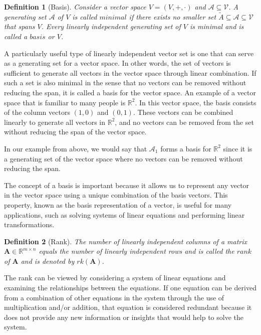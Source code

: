 \documentclass[12pt]{book}
\newtheorem{definition}{Definition}[section]
\begin{document}
	\begin{definition}[Basis]
		\normalfont Consider a vector space $\textit{V} = (\textit{V}, +, \cdot)$ and $\mathcal{A} \subseteq \mathcal{V}$. A generating set $\mathcal{A}$ of $\textit{V}$ is called $\textit{minimal}$ if there exists no smaller set $\tilde{A} \subseteq \mathcal{A} \subseteq \mathcal{V}$ that spans $\textit{V}$. Every linearly independent generating set of $\textit{V}$  is minimal and is called a $\mathit{basis}$ or $\textit{V}$.
	\end{definition}
	
	A particularly useful type of linearly independent vector set is one that can serve as a generating set for a vector space. In other words, the set of vectors is sufficient to generate all vectors in the vector space through linear combination. If such a set is also minimal in the sense that no vectors can be removed without reducing the span, it is called a basis for the vector space. An example of a vector space that is familiar to many people is $\mathbb{R}^2$. In this vector space, the basis consists of the column vectors $(1, 0)$ and $(0, 1)$. These vectors can be combined linearly to generate all vectors in $\mathbb{R}^2$, and no vectors can be removed from the set without reducing the span of the vector space.
	
	In our example from above, we would say that $\mathcal{A}_1$ forms a basis for $\mathbb{R}^2$ since it is a generating set of the vector space where no vectors can be removed without reducing the span. 
	
	The concept of a basis is important because it allows us to represent any vector in the vector space using a unique combination of the basis vectors. This property, known as the basis representation of a vector, is useful for many applications, such as solving systems of linear equations and performing linear transformations.
	
	\begin{definition}[Rank]
		\normalfont The number of linearly independent columns of a matrix $\textbf{A} \in \mathbb{R}^{m \times n}$ equals the number of linearly independent rows and is called the $\textit{rank}$ of $\textbf{A}$ and is denoted by $rk(\textbf{A})$.
	\end{definition}
	
	The rank can be viewed by considering a system of linear equations and examining the relationships between the equations. If one equation can be derived from a combination of other equations in the system through the use of multiplication and/or addition, that equation is considered redundant because it does not provide any new information or insights that would help to solve the system.
	
\end{document}
